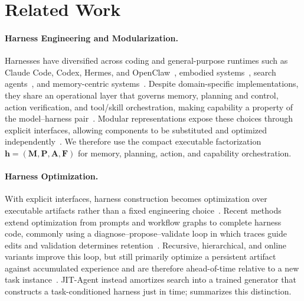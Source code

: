 \documentclass{article}
\newcommand{\ourmethod}{JIT-Agent\xspace}
\begin{document}
\vspace{-0.5em}
\section{Related Work}
\vspace{-0.5em}
\paragraph{Harness Engineering and Modularization.} Harnesses have diversified across coding and general-purpose runtimes such as Claude Code, Codex, Hermes, and OpenClaw~\citep{githubGitHubAnthropicsclaudecode,openaiCodexCoding,nous2026hermes,openclaw2026}, embodied systems~\citep{zhang2026harnessvla,lee2026physicalaiharness}, search agents~\citep{apodex2026,qin2025flashsearcherfasteffectiveweb}, and memory-centric systems~\citep{chhikara2025mem0,hu2026evermemos,zhang2025memevolve}. Despite domain-specific implementations, they share an operational layer that governs memory, planning and control, action verification, and tool/skill orchestration, making capability a property of the model--harness pair~\citep{meng2026agent,zhou2026externalizationllmagentsunified,pan2026natural}. Modular representations expose these choices through explicit interfaces, allowing components to be substituted and optimized independently~\citep{chen2026harnessx,ning2026code}. We therefore use the compact executable factorization $\mathbf{h}=(\mathbf{M},\mathbf{P},\mathbf{A},\mathbf{F})$ for memory, planning, action, and capability orchestration.
\vspace{-0.5em}
\paragraph{Harness Optimization.} With explicit interfaces, harness construction becomes optimization over executable artifacts rather than a fixed engineering choice~\citep{khattab2023dspy,yuksekgonul2024textgradautomaticdifferentiationtext,hu2024adas,shang2024agentsquare}. Recent methods extend optimization from prompts and workflow graphs to complete harness code, commonly using a diagnose--propose--validate loop in which traces guide edits and validation determines retention~\citep{zhang_aflow_2024,lee2026metaharnessendtoendoptimizationmodel,lin2026agenticharnessengineeringobservabilitydriven,chen2026harnessx}. Recursive, hierarchical, and online variants improve this loop, but still primarily optimize a persistent artifact against accumulated experience and are therefore ahead-of-time relative to a new task instance~\citep{lee2026recursiveharness,zhou2026hierarchicalselfimprovement,nie2026tthe,shao2026harnessr1}. \ourmethod instead amortizes search into a trained generator that constructs a task-conditioned harness just in time;  summarizes this distinction.
\vspace{-0.5em}
\end{document}
